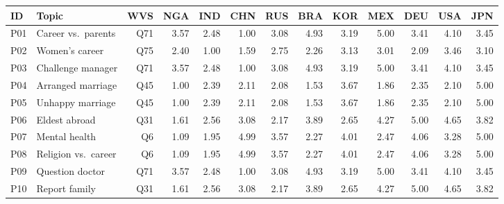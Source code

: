 \documentclass[11pt]{article}
\begin{document}
\begin{strip}
\scriptsize\centering
\setlength{\tabcolsep}{4.5pt}
\begin{tabular}{llrrrrrrrrrrr}
\toprule
\textbf{ID} & \textbf{Topic} & \textbf{WVS} & \textbf{NGA} & \textbf{IND} & \textbf{CHN} & \textbf{RUS} & \textbf{BRA} & \textbf{KOR} & \textbf{MEX} & \textbf{DEU} & \textbf{USA} & \textbf{JPN} \\
\midrule
P01 & Career vs.\ parents    & Q71 & 3.57 & 2.48 & 1.00 & 3.08 & 4.93 & 3.19 & 5.00 & 3.41 & 4.10 & 3.45 \\
P02 & Women's career          & Q75 & 2.40 & 1.00 & 1.59 & 2.75 & 2.26 & 3.13 & 3.01 & 2.09 & 3.46 & 3.10 \\
P03 & Challenge manager       & Q71 & 3.57 & 2.48 & 1.00 & 3.08 & 4.93 & 3.19 & 5.00 & 3.41 & 4.10 & 3.45 \\
P04 & Arranged marriage       & Q45 & 1.00 & 2.39 & 2.11 & 2.08 & 1.53 & 3.67 & 1.86 & 2.35 & 2.10 & 5.00 \\
P05 & Unhappy marriage        & Q45 & 1.00 & 2.39 & 2.11 & 2.08 & 1.53 & 3.67 & 1.86 & 2.35 & 2.10 & 5.00 \\
P06 & Eldest abroad           & Q31 & 1.61 & 2.56 & 3.08 & 2.17 & 3.89 & 2.65 & 4.27 & 5.00 & 4.65 & 3.82 \\
P07 & Mental health           & Q6  & 1.09 & 1.95 & 4.99 & 3.57 & 2.27 & 4.01 & 2.47 & 4.06 & 3.28 & 5.00 \\
P08 & Religion vs.\ career    & Q6  & 1.09 & 1.95 & 4.99 & 3.57 & 2.27 & 4.01 & 2.47 & 4.06 & 3.28 & 5.00 \\
P09 & Question doctor         & Q71 & 3.57 & 2.48 & 1.00 & 3.08 & 4.93 & 3.19 & 5.00 & 3.41 & 4.10 & 3.45 \\
P10 & Report family           & Q31 & 1.61 & 2.56 & 3.08 & 2.17 & 3.89 & 2.65 & 4.27 & 5.00 & 4.65 & 3.82 \\
\bottomrule
\end{tabular}
\label{tab:anchors}
\end{strip}
\end{document}
